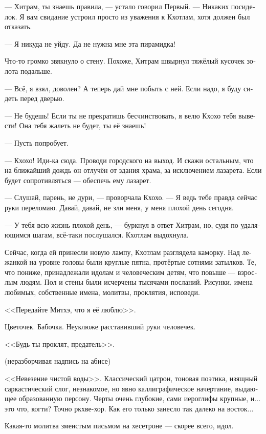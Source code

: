 \documentclass[a4paper,12pt,fleqn]{book}\usepackage{polyglossia}\setdefaultlanguage[babelshorthands=true]{russian}\setotherlanguage{english}\defaultfontfeatures{Ligatures=TeX,Mapping=tex-text}\usepackage{xcolor}\newcommand{\ml}[3]{#2}
\newcommand{\asterism}{\vspace{1em}{\centering\Large\bfseries$\ast~\ast~\ast$\par}\vspace{1em}}
\begin{document}
--- Хитрам, ты знаешь правила, --- устало говорил Первый.
--- Никаких посиделок.
Я вам свидание устроил просто из уважения к Кхотлам, хотя должен был отказать.

--- Я никуда не уйду.
Да не нужна мне эта пирамидка!

Что-то громко звякнуло о стену.
Похоже, Хитрам швырнул тяжёлый кусочек золота подальше.

--- Всё, я взял, доволен?
А теперь дай мне побыть с ней.
Если надо, я буду сидеть перед дверью.

--- Не будешь!
Если ты не прекратишь бесчинствовать, я велю Кхохо тебя вывести!
Она тебя жалеть не будет, ты её знаешь!

--- Пусть попробует.

--- Кхохо!
Иди-ка сюда.
Проводи городского на выход.
И скажи остальным, что на ближайший дождь он отлучён от здания храма, за исключением лазарета.
Если будет сопротивляться --- обеспечь ему лазарет.

--- Слушай, парень, не дури, --- проворчала Кхохо.
--- Я ведь тебе правда сейчас руки переломаю.
Давай, давай, не зли меня, у меня плохой день сегодня.

--- У тебя всю жизнь плохой день, --- буркнул в ответ Хитрам, но, судя по удаляющимся шагам, всё-таки послушался.
Кхотлам выдохнула.

\asterism

Сейчас, когда ей принесли новую лампу, Кхотлам разглядела каморку.
Над лежанкой на уровне головы были круглые пятна, протёртые сотнями затылков.
Те, что пониже, принадлежали идолам и человеческим детям, что повыше --- взрослым людям.
Пол и стены были исчерчены тысячами посланий.
Рисунки, имена любимых, собственные имена, молитвы, проклятия, исповеди.

<<Передайте Митхэ, что я её люблю>>.

Цветочек.
Бабочка.
Неуклюже расставивший руки человечек.

<<Будь ты проклят, предатель>>.

(неразборчивая надпись на абисе)

<<Невезение чистой воды>>.
Классический цатрон, тоновая поэтика, изящный саркастический слог, незнакомое, но явно каллиграфическое начертание, выдающее образованную персону.
Черты очень глубокие, сами иероглифы крупные, и... это что, когти?
Точно ркхве-хор.
Как его только занесло так далеко на восток...

Какая-то молитва змеистым письмом на хесетроне --- скорее всего, идол.
\end{document}
